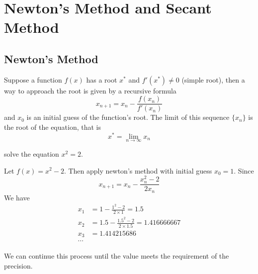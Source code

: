 \section{Newton's Method and Secant Method}
\subsection*{Newton's Method}
\begin{thm}
	Suppose a function $f(x)$ has a root $x^*$ and $f'(x^*) \neq 0$ (simple root), then a way to approach the root is given by a recursive formula
	\[ x_{n+1} = x_n - \frac{f(x_n)}{f'(x_n)} \]
	and $x_0$ is an initial guess of the function's root. The limit of this sequence $\{x_n\}$ is the root of the equation, that is 
	\[ x^* = \lim_{n\to\infty} x_n \]
\end{thm}

\begin{ex}
	solve the equation $x^2 = 2$. 
\end{ex}
\begin{solution}
	Let $f(x) = x^2-2$. Then apply newton's method with initial guess $x_0=1$. Since
	\[ x_{n+1} = x_n - \frac{x_n^2 -2}{2x_n} \]
	We have
	\begin{align*}
	x_1 &= 1 - \frac{1^2 - 2}{2\times 1} = 1.5\\
	x_2 &= 1.5 - \frac{1.5^2 - 2}{2\times 1.5} = 1.416666667\\
	x_3 &= 1.414215686\\
	\cdots
	\end{align*}
	
	We can continue this process until the value meets the requirement of the precision. 
\end{solution}

